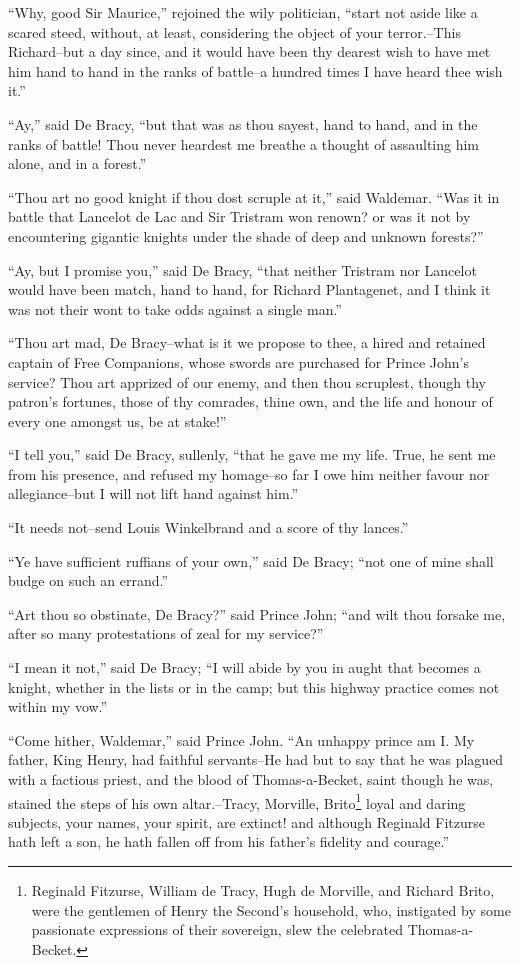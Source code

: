 ``Why, good Sir Maurice,'' rejoined the wily politician, ``start not
aside like a scared steed, without, at least, considering the object of
your terror.--This Richard--but a day since, and it would have been thy
dearest wish to have met him hand to hand in the ranks of battle--a
hundred times I have heard thee wish it.''

``Ay,'' said De Bracy, ``but that was as thou sayest, hand to hand, and
in the ranks of battle! Thou never heardest me breathe a thought of
assaulting him alone, and in a forest.''

``Thou art no good knight if thou dost scruple at it,'' said Waldemar.
``Was it in battle that Lancelot de Lac and Sir Tristram won renown? or
was it not by encountering gigantic knights under the shade of deep and
unknown forests?''

``Ay, but I promise you,'' said De Bracy, ``that neither Tristram nor
Lancelot would have been match, hand to hand, for Richard Plantagenet,
and I think it was not their wont to take odds against a single man.''

``Thou art mad, De Bracy--what is it we propose to thee, a hired and
retained captain of Free Companions, whose swords are purchased for
Prince John's service? Thou art apprized of our enemy, and then thou
scruplest, though thy patron's fortunes, those of thy comrades, thine
own, and the life and honour of every one amongst us, be at stake!''

``I tell you,'' said De Bracy, sullenly, ``that he gave me my life.
True, he sent me from his presence, and refused my homage--so far I owe
him neither favour nor allegiance--but I will not lift hand against
him.''

``It needs not--send Louis Winkelbrand and a score of thy lances.''

``Ye have sufficient ruffians of your own,'' said De Bracy; ``not one of
mine shall budge on such an errand.''

``Art thou so obstinate, De Bracy?'' said Prince John; ``and wilt thou
forsake me, after so many protestations of zeal for my service?''

``I mean it not,'' said De Bracy; ``I will abide by you in aught that
becomes a knight, whether in the lists or in the camp; but this highway
practice comes not within my vow.''

``Come hither, Waldemar,'' said Prince John. ``An unhappy prince am I.
My father, King Henry, had faithful servants--He had but to say that he
was plagued with a factious priest, and the blood of Thomas-a-Becket,
saint though he was, stained the steps of his own altar.--Tracy,
Morville, Brito\footnote{Reginald Fitzurse, William de Tracy, Hugh
de Morville,
and Richard Brito, were the gentlemen of Henry the Second's household,
who, instigated by some passionate expressions of their sovereign, slew
the celebrated Thomas-a-Becket.} loyal and daring subjects, your names, your
spirit, are extinct! and although Reginald Fitzurse hath left a son, he
hath fallen off from his father's fidelity and courage.''

